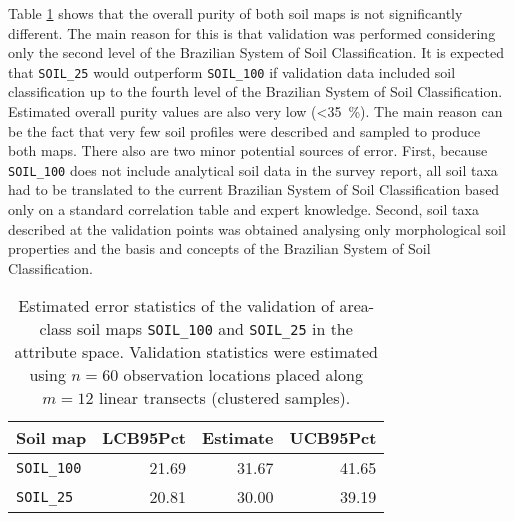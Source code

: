 Table \ref{tab:covar-data-soil-attr-val} shows that the overall purity of both soil maps is not 
significantly different. The main reason for this is that validation was performed considering only 
the second level of the Brazilian System of Soil Classification. It is expected that 
\texttt{SOIL\_25} would outperform \texttt{SOIL\_100} if validation data included soil 
classification up to the fourth level of the Brazilian System of Soil Classification. Estimated 
overall purity values are also very low (\SI{<35}{\percent}). The main reason can be the fact that 
very few soil profiles were described and sampled to produce both maps. There also are two minor 
potential sources of error. First, because \texttt{SOIL\_100} does not include analytical soil data 
in the survey report, all soil taxa had to be translated to the current Brazilian System of Soil 
Classification based only on a standard correlation table \cite{SantosEtAl2006} and expert 
knowledge. Second, soil taxa described at the validation points was obtained analysing only 
morphological soil properties and the basis and concepts of the Brazilian System of Soil 
Classification.

\begin{table}[ht]
 \caption{Estimated error statistics of the validation of area-class soil maps \texttt{SOIL\_100}
 and \texttt{SOIL\_25} in the attribute space. Validation statistics were estimated using $n = 60$ 
 observation locations placed along $m = 12$ linear transects (clustered samples).}
 \label{tab:covar-data-soil-attr-val}
 \centering
 {\small
 \begin{tabular}{lrrr}
  \hline
  Soil map              & LCB95Pct & Estimate & UCB95Pct \\
  \hline
  \texttt{SOIL\_100}    & 21.69    & 31.67    & 41.65    \\
  \texttt{SOIL\_25}     & 20.81    & 30.00    & 39.19    \\
  \hline
 \end{tabular}}
\end{table}


